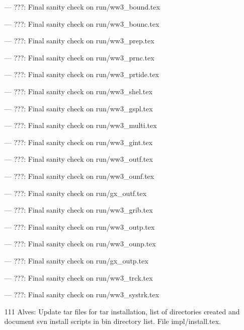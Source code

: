 \begin{itemize}
\item[---] ???: Final sanity check on run/ww3\_bound.tex

\item[---] ???: Final sanity check on run/ww3\_bounc.tex

\item[---] ???: Final sanity check on run/ww3\_prep.tex

\item[---] ???: Final sanity check on run/ww3\_prnc.tex

\item[---] ???: Final sanity check on run/ww3\_prtide.tex

\item[---] ???: Final sanity check on run/ww3\_shel.tex

\item[---] ???: Final sanity check on run/ww3\_gspl.tex

\item[---] ???: Final sanity check on run/ww3\_multi.tex

\item[---] ???: Final sanity check on run/ww3\_gint.tex

\item[---] ???: Final sanity check on run/ww3\_outf.tex

\item[---] ???: Final sanity check on run/ww3\_ounf.tex

\item[---] ???: Final sanity check on run/gx\_outf.tex

\item[---] ???: Final sanity check on run/ww3\_grib.tex

\item[---] ???: Final sanity check on run/ww3\_outp.tex

\item[---] ???: Final sanity check on run/ww3\_ounp.tex

\item[---] ???: Final sanity check on run/gx\_outp.tex

\item[---] ???: Final sanity check on run/ww3\_trck.tex

\item[---] ???: Final sanity check on run/ww3\_systrk.tex

\item[111] Alves: Update tar files for tar installation, list of directories
  created and document svn install scripts in bin directory list. File
  impl/install.tex. 


\end{itemize}
